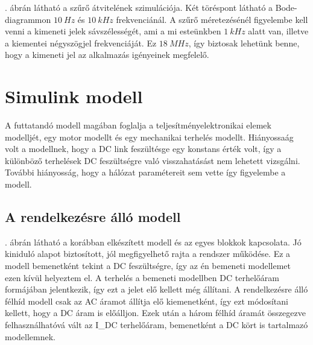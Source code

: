 . ábrán látható a szűrő átvitelének szimulációja. Két töréspont látható a Bode-diagrammon $10\ Hz$ és $10\ kHz$ frekvenciánál. A szűrő méretezésénél figyelembe kell venni a kimeneti jelek sávszélességét, ami a mi esteünkben $1\ kHz$ alatt van, illetve a kiementei négyszögjel frekvenciáját. Ez $18\ MHz$, így biztosak lehetünk benne, hogy a kimeneti jel az alkalmazás igényeinek megfelelő.

\section{Simulink modell}

A futtatandó modell magában foglalja a teljesítményelektronikai elemek modelljét, egy motor modellt és egy mechanikai terhelés modellt. Hiányossaág volt a modellnek, hogy a DC link feszültésge egy konstans érték volt, így a különböző terhelések DC feszültségre való visszahatásást nem lehetett vizsgálni. További hiányosság, hogy a hálózat paramétereit sem vette így figyelembe a modell.

\subsection{A rendelkezésre álló modell}

. ábrán látható a korábban elkészített modell és az egyes blokkok kapcsolata. Jó kiniduló alapot biztosított, jól megfigyelhető rajta a rendszer működése. Ez a modell bemenetként tekint a DC feszültségre, így az én bemeneti modellemet ezen kívül helyeztem el. A terhelés a bemeneti modellben DC terhelőáram formájában jelentkezik, így ezt a jelet elő kellett még állítani. A rendelkezésre álló félhíd modell csak az AC áramot állítja elő kiemenetként, így ezt módosítani kellett, hogy a DC áram is előálljon. Ezek után a három félhíd áramát összegezve felhasználhatóvá vált az I_{DC} terhelőáram, bemenetként a DC kört is tartalmazó modellemnek.


